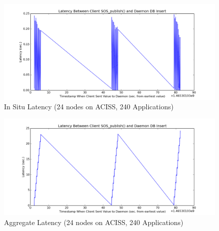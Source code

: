 


\begin{figure}[h]
\centering
\includegraphics[width=\columnwidth]{images/aciss_latency_24_situ.png}
\caption{In Situ Latency (24 nodes on ACISS, 240 Applications)}
\label{aciss_lat_24_situ}
\end{figure}

\begin{figure}[h]
\centering
\includegraphics[width=\columnwidth]{images/aciss_latency_24_agg.png}
\caption{Aggregate Latency (24 nodes on ACISS, 240 Applications)}
\label{aciss_lat_24_agg}
\end{figure}
%
\par
%
%

